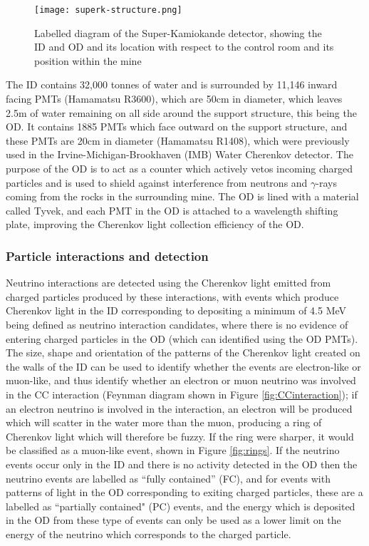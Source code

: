 \documentclass[11pt,oneside,a4paper]{article}
\begin{document}
\begin{figure}[htbp]
	\centering
	\texttt{[image: superk-structure.png]}
	\caption{Labelled diagram of the Super-Kamiokande detector, showing the ID and OD and its location with respect to the control room and its position within the mine}
	\label{fig:superk-structure}
\end{figure}

The ID  contains 32,000 tonnes of water and is surrounded by 11,146 inward facing PMTs (Hamamatsu R3600), which are 50cm in diameter, which leaves 2.5m of water remaining on all side around the support structure, this being the OD.  It contains 1885 PMTs which face outward on the support structure, and these PMTs are 20cm in diameter (Hamamatsu R1408),  which were previously used in the Irvine-Michigan-Brookhaven (IMB) Water Cherenkov detector. The purpose of the OD is to act as a counter which actively vetos incoming charged particles and is used to shield against interference from neutrons and $\gamma$-rays coming from the rocks in the surrounding mine. The OD is lined with a material called Tyvek, and each PMT in the OD is attached to a wavelength shifting plate, improving the Cherenkov light collection efficiency of the OD. 

\subsubsection{Particle interactions and detection}
Neutrino interactions are detected using the Cherenkov light emitted from charged particles produced by these interactions, with events which produce Cherenkov light in the ID corresponding to depositing a minimum of 4.5 MeV being defined as neutrino interaction candidates, where there is no evidence of entering charged particles in the OD (which can identified using the OD PMTs). The size, shape and orientation of the patterns of the Cherenkov light created on the walls of the ID can be used to identify whether the events are electron-like or muon-like, and thus identify whether an electron or muon neutrino was involved in the CC interaction (Feynman diagram shown in Figure \ref{fig:CCinteraction}); if an electron neutrino is involved in the interaction, an electron will be produced which will scatter in the water more than the muon, producing a ring of Cherenkov light which will therefore be fuzzy. If the ring were sharper, it would be classified as a muon-like event, shown in Figure \ref{fig:rings}. If the neutrino events occur only in the ID and there is no activity detected in the OD then the neutrino events are labelled as ``fully contained'' (FC), and for events with patterns of light in the OD corresponding to exiting charged particles, these are a labelled as ``partially contained" (PC) events, and the energy which is deposited in the OD from these type of events can only be used as a lower limit on the energy of the neutrino which corresponds to the charged particle.
\end{document}
